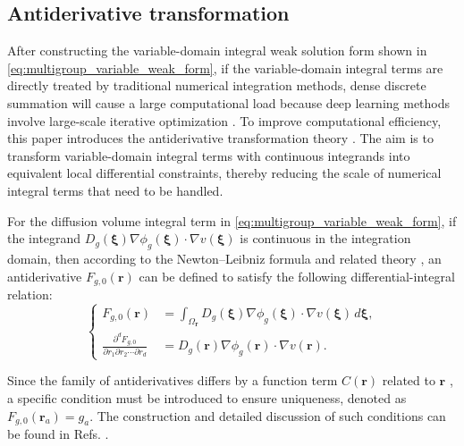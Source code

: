 \documentclass[final,3p,times,sort&compress]{elsarticle}
\begin{document}
\subsection{Antiderivative transformation}
\label{subsec:antiderivative_transform}

After constructing the variable-domain integral weak solution form shown in \cref{eq:multigroup_variable_weak_form}, if the variable-domain integral terms are directly treated by traditional numerical integration methods, dense discrete summation will cause a large computational load because deep learning methods involve large-scale iterative optimization \cite{liu2025neutron}. To improve computational efficiency, this paper introduces the antiderivative transformation theory \cite{liu2024repeated}. The aim is to transform variable-domain integral terms with continuous integrands into equivalent local differential constraints, thereby reducing the scale of numerical integral terms that need to be handled.

For the diffusion volume integral term in \cref{eq:multigroup_variable_weak_form}, if the integrand $D_g(\boldsymbol \xi) \nabla \phi_g(\boldsymbol \xi) \cdot \nabla v(\boldsymbol \xi)$ is continuous in the integration domain, then according to the Newton--Leibniz formula \cite{courant1999introduction} and related theory \cite{liu2024repeated}, an antiderivative $F_{g,0}(\boldsymbol r)$ can be defined to satisfy the following differential-integral relation:
\begin{equation}
    \left\{
    \begin{aligned}
        F_{g,0}(\boldsymbol r) &= \int_{\Omega_{\boldsymbol r}} D_g(\boldsymbol \xi) \nabla \phi_g(\boldsymbol \xi) \cdot \nabla v(\boldsymbol \xi) \,d\boldsymbol \xi , \\
        \frac{\partial^d F_{g,0}}{\partial r_1\partial r_2\cdots\partial r_d} &= D_g(\boldsymbol r) \nabla \phi_g(\boldsymbol r) \cdot \nabla v(\boldsymbol r) .
    \end{aligned}
    \right.
    \label{eq:Fg0_integral}
\end{equation}

Since the family of antiderivatives differs by a function term $C(\boldsymbol{r})$ related to $\boldsymbol{r}$ \cite{courant1999introduction}, a specific condition must be introduced to ensure uniqueness, denoted as $F_{g,0}({\boldsymbol{r}}_{a}) = {g}_{a}$. The construction and detailed discussion of such conditions can be found in Refs. \cite{liu2024repeated, liu2026variabledomain, liu2026supplementary}.
\end{document}
